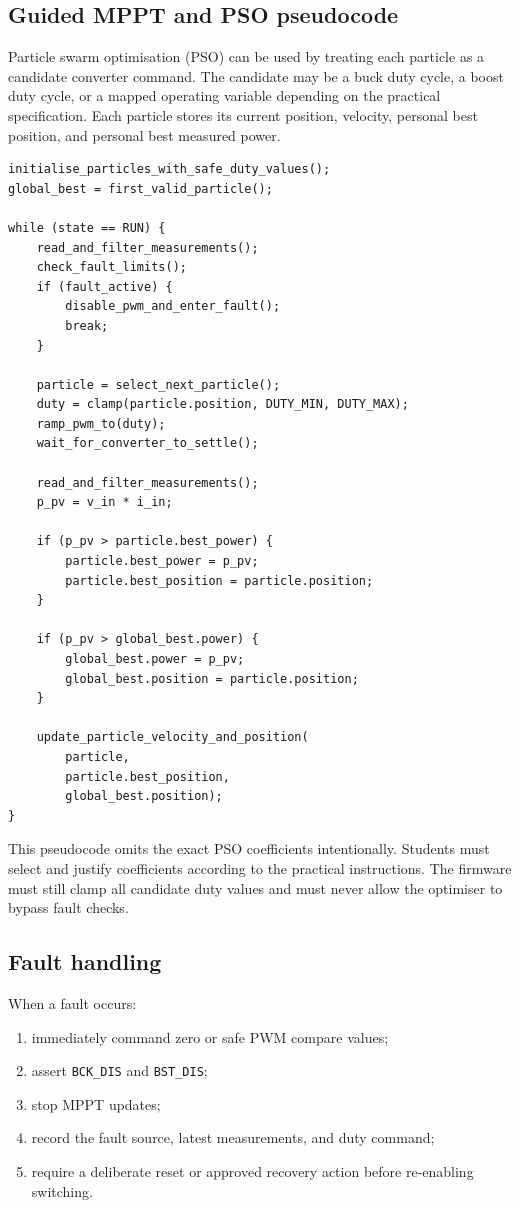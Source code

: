 \documentclass[11pt,a4paper]{article}
\newcommand{\code}[1]{\texttt{#1}}
\begin{document}
\subsection{Guided MPPT and PSO pseudocode}

Particle swarm optimisation (PSO) can be used by treating each particle as a candidate converter command. The candidate may be a buck duty cycle, a boost duty cycle, or a mapped operating variable depending on the practical specification. Each particle stores its current position, velocity, personal best position, and personal best measured power.

\begin{lstlisting}[caption={Guided PSO-style MPPT structure}]
initialise_particles_with_safe_duty_values();
global_best = first_valid_particle();

while (state == RUN) {
    read_and_filter_measurements();
    check_fault_limits();
    if (fault_active) {
        disable_pwm_and_enter_fault();
        break;
    }

    particle = select_next_particle();
    duty = clamp(particle.position, DUTY_MIN, DUTY_MAX);
    ramp_pwm_to(duty);
    wait_for_converter_to_settle();

    read_and_filter_measurements();
    p_pv = v_in * i_in;

    if (p_pv > particle.best_power) {
        particle.best_power = p_pv;
        particle.best_position = particle.position;
    }

    if (p_pv > global_best.power) {
        global_best.power = p_pv;
        global_best.position = particle.position;
    }

    update_particle_velocity_and_position(
        particle,
        particle.best_position,
        global_best.position);
}
\end{lstlisting}

This pseudocode omits the exact PSO coefficients intentionally. Students must select and justify coefficients according to the practical instructions. The firmware must still clamp all candidate duty values and must never allow the optimiser to bypass fault checks.

\subsection{Fault handling}

When a fault occurs:
\begin{enumerate}
  \item immediately command zero or safe PWM compare values;
  \item assert \code{BCK\_DIS} and \code{BST\_DIS};
  \item stop MPPT updates;
  \item record the fault source, latest measurements, and duty command;
  \item require a deliberate reset or approved recovery action before re-enabling switching.
\end{enumerate}
\end{document}
